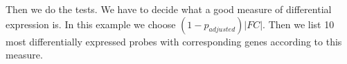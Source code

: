 Then we do the tests. We have to decide what a good measure of differential expression is. In this example we choose $(1-p_{adjusted})|FC|$. Then we list 10 most differentially expressed probes with corresponding genes according to this measure.
